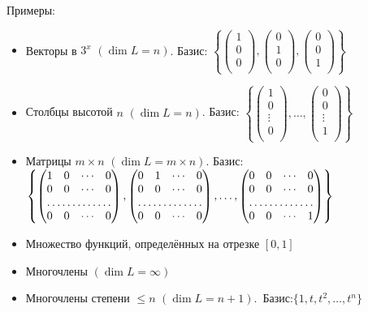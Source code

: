 Примеры:
\begin{itemize}
	\item Векторы в $3^x$ $(\dim L = n)$. Базис: $\left\{\left(\begin{array}{c} %
	1\\  
	0\\
	0\\
	\end{array}\right),\left(\begin{array}{c}
	0\\  
	1\\
	0\\
	\end{array}\right),\left(\begin{array}{c}
	0\\  
	0\\
	1\\
	\end{array}\right)\right\}$
	\item Столбцы высотой $n$ $(\dim L = n)$. Базис: $\left\{\left(\begin{array}{c}
	1\\  
	0\\
	\vdots\\
	0\\
	\end{array}\right),\ldots,\left(\begin{array}{c}
	0\\
	0\\
	\vdots\\
	1\\
	\end{array}\right)\right\}$
	\item Матрицы $m\times n$ $(\dim L =m\times n)$. Базис: $\left\{\begin{pmatrix}
	1 & 0 & \cdots & 0 \\  
	0 & 0 & \cdots & 0 \\    
	\hdotsfor{4} \\
	0 & 0 & \cdots & 0
	\end{pmatrix},\begin{pmatrix}
	0 & 1 & \cdots & 0 \\  
	0 & 0 & \cdots & 0 \\       
	\hdotsfor{4} \\
	0 & 0 & \cdots & 0
	\end{pmatrix},\dots,\begin{pmatrix}
	0 & 0 & \cdots & 0 \\  
	0 & 0 & \cdots & 0 \\       
	\hdotsfor{4} \\
	0 & 0 & \cdots & 1
	\end{pmatrix}\right\}$
	\item Множество функций, определённых на отрезке $[0,1]$ %
	\item Многочлены $(\dim L = \infty)$
	\item Многочлены степени $\leq n$ $(\dim L = n+1)$.~Базис:$\{1, t, t^2, \dots,  t^n\}$ %
\end{itemize}

